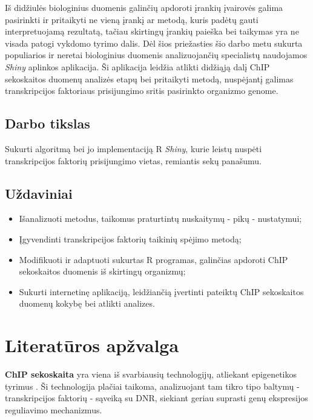 \documentclass[12pt]{article}
\begin{document}
Iš didžiulės biologinius duomenis galinčių apdoroti įrankių įvairovės galima
pasirinkti ir pritaikyti ne vieną įrankį ar metodą, kuris padėtų gauti
interpretuojamą rezultatą, tačiau skirtingų įrankių paieška bei taikymas yra ne
visada patogi vykdomo tyrimo dalis. Dėl šios priežasties šio darbo metu
sukurta populiarios ir neretai biologinius duomenis analizuojančių specialistų
naudojamos \emph{Shiny} aplinkos aplikacija. Ši aplikacija leidžia atlikti
didžiąją dalį ChIP sekoskaitos duomenų analizės etapų bei pritaikyti metodą,
nuspėjantį galimas transkripcijos faktoriaus prisijungimo sritis pasirinkto 
organizmo genome.

\subsection*{Darbo tikslas}
Sukurti algoritmą bei jo implementaciją R \emph{Shiny}, kurie leistų nuspėti
transkripcijos faktorių prisijungimo vietas, remiantis sekų panašumu.

\subsection*{Uždaviniai}
\begin{itemize}
    \item Išanalizuoti metodus, taikomus praturtintų nuskaitymų - pikų -
          nustatymui;
    \item Įgyvendinti transkripcijos faktorių taikinių spėjimo metodą;
    \item Modifikuoti ir adaptuoti sukurtas R programas, galinčias apdoroti
          ChIP sekoskaitos duomenis iš skirtingų organizmų;          
    \item Sukurti internetinę aplikaciją, leidžiančią įvertinti pateiktų
          ChIP sekoskaitos duomenų kokybę bei atlikti analizes.

\end{itemize}

\newpage


\section{Literatūros apžvalga}
\textbf{ChIP sekoskaita} yra viena iš svarbiausių technologijų, atliekant
epigenetikos tyrimus \cite{ARTICLE1}. Ši technologija plačiai taikoma,
analizuojant tam tikro tipo baltymų - transkripcijos faktorių -  sąveiką su DNR,
siekiant geriau suprasti genų ekspresijos reguliavimo mechanizmus.
\end{document}
